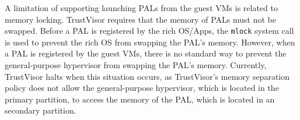 A limitation of supporting launching PALs from the guest VMs is related to memory locking. TrustVisor requires that the memory of PALs must not be swapped. Before a PAL is registered by the rich OS/Apps, the \lstinline{mlock} system call is used to prevent the rich OS from swapping the PAL's memory. However, when a PAL is registered by the guest VMs, there is no standard way to prevent the general-purpose hypervisor from swapping the PAL's memory. Currently, TrustVisor halts when this situation occurs, as TrustVisor's memory separation policy does not allow the general-purpose hypervisor, which is located in the  primary partition, to access the memory of the PAL, which is located in an  secondary partition.

